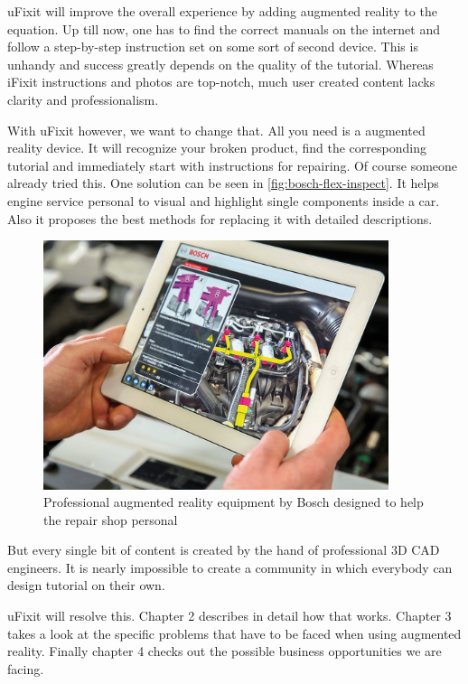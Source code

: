 	uFixit will improve the overall experience by adding augmented reality to the equation. Up till now, one has to find the correct manuals on the internet and follow a step-by-step instruction set on some sort of second device. This is unhandy and success greatly depends on the quality of the tutorial. Whereas iFixit instructions and photos are top-notch, much user created content lacks clarity and professionalism.
	
	With uFixit however, we want to change that. All you need is a augmented reality device. It will recognize your broken product, find the corresponding tutorial and immediately start with instructions for repairing. Of course someone already tried this. One solution can be seen in \autoref{fig:bosch-flex-inspect}. It helps engine service personal to visual and highlight single components inside a car. Also it proposes the best methods for replacing it with detailed descriptions.
	
	\begin{figure}[H]
		\includegraphics[width=0.9\textwidth]{../images/bosch-flex-inspect.jpg}
		\centering
		\caption[Professional augmented reality equipment by Bosch designed to help the repair shop personal]{Professional augmented reality equipment by Bosch designed to help the repair shop personal\footnotemark}
		\label{fig:bosch-flex-inspect}
	\end{figure}
	
	But every single bit of content is created by the hand of professional 3D CAD engineers. It is nearly impossible to create a community in which everybody can design tutorial on their own.
	
	uFixit will resolve this. Chapter 2 describes in detail how that works. Chapter 3 takes a look at the specific problems that have to be faced when using augmented reality. Finally chapter 4 checks out the possible business opportunities we are facing.


